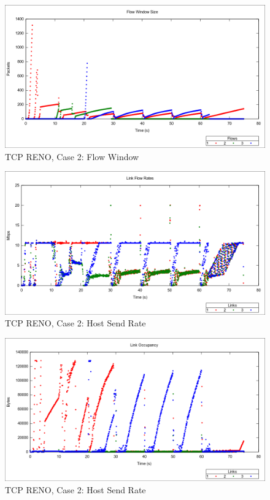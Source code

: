 \begin{figure}[htbp]
    \centering
    \includegraphics[width=\textwidth]{reno2/Flow_Window.png}
    \caption{TCP RENO, Case 2: Flow Window}
\end{figure}


\begin{figure}[htbp]
    \centering
    \includegraphics[width=\textwidth]{reno2/Link_Flow_Rate.png}
    \caption{TCP RENO, Case 2: Host Send Rate}
\end{figure}

\begin{figure}[htbp]
    \centering
    \includegraphics[width=\textwidth]{reno2/Link_Occupancy.png}
    \caption{TCP RENO, Case 2: Host Send Rate}
\end{figure}

